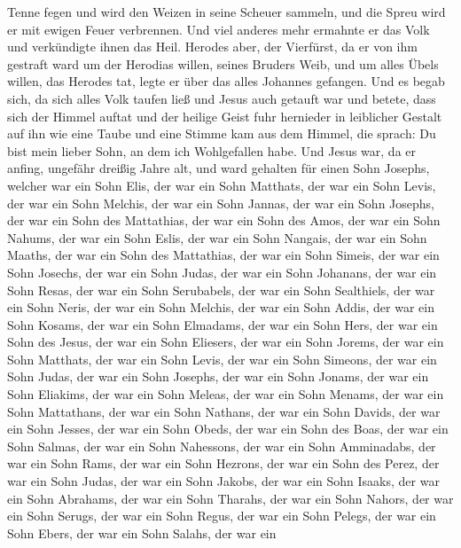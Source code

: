 Tenne fegen und wird den Weizen in seine Scheuer sammeln, und die Spreu
wird er mit ewigen Feuer verbrennen.  Und viel anderes mehr
ermahnte er das Volk und verkündigte ihnen das Heil. 
Herodes aber, der Vierfürst, da er von ihm gestraft ward um der Herodias
willen, seines Bruders Weib, und um alles Übels willen, das Herodes tat,
 legte er über das alles Johannes gefangen. 
Und es begab sich, da sich alles Volk taufen ließ und Jesus auch getauft
war und betete, dass sich der Himmel auftat  und der
heilige Geist fuhr hernieder in leiblicher Gestalt auf ihn wie eine
Taube und eine Stimme kam aus dem Himmel, die sprach: Du bist mein
lieber Sohn, an dem ich Wohlgefallen habe.  Und Jesus war,
da er anfing, ungefähr dreißig Jahre alt, und ward gehalten für einen
Sohn Josephs, welcher war ein Sohn Elis,  der war ein Sohn
Matthats, der war ein Sohn Levis, der war ein Sohn Melchis, der war ein
Sohn Jannas, der war ein Sohn Josephs,  der war ein Sohn
des Mattathias, der war ein Sohn des Amos, der war ein Sohn Nahums, der
war ein Sohn Eslis, der war ein Sohn Nangais,  der war ein
Sohn Maaths, der war ein Sohn des Mattathias, der war ein Sohn Simeis,
der war ein Sohn Josechs, der war ein Sohn Judas,  der war
ein Sohn Johanans, der war ein Sohn Resas, der war ein Sohn Serubabels,
der war ein Sohn Sealthiels, der war ein Sohn Neris,  der
war ein Sohn Melchis, der war ein Sohn Addis, der war ein Sohn Kosams,
der war ein Sohn Elmadams, der war ein Sohn Hers,  der war
ein Sohn des Jesus, der war ein Sohn Eliesers, der war ein Sohn Jorems,
der war ein Sohn Matthats, der war ein Sohn Levis,  der war
ein Sohn Simeons, der war ein Sohn Judas, der war ein Sohn Josephs, der
war ein Sohn Jonams, der war ein Sohn Eliakims,  der war
ein Sohn Meleas, der war ein Sohn Menams, der war ein Sohn Mattathans,
der war ein Sohn Nathans, der war ein Sohn Davids,  der war
ein Sohn Jesses, der war ein Sohn Obeds, der war ein Sohn des Boas, der
war ein Sohn Salmas, der war ein Sohn Nahessons,  der war
ein Sohn Amminadabs, der war ein Sohn Rams, der war ein Sohn Hezrons,
der war ein Sohn des Perez, der war ein Sohn Judas,  der
war ein Sohn Jakobs, der war ein Sohn Isaaks, der war ein Sohn Abrahams,
der war ein Sohn Tharahs, der war ein Sohn Nahors,  der war
ein Sohn Serugs, der war ein Sohn Regus, der war ein Sohn Pelegs, der
war ein Sohn Ebers, der war ein Sohn Salahs,  der war ein
